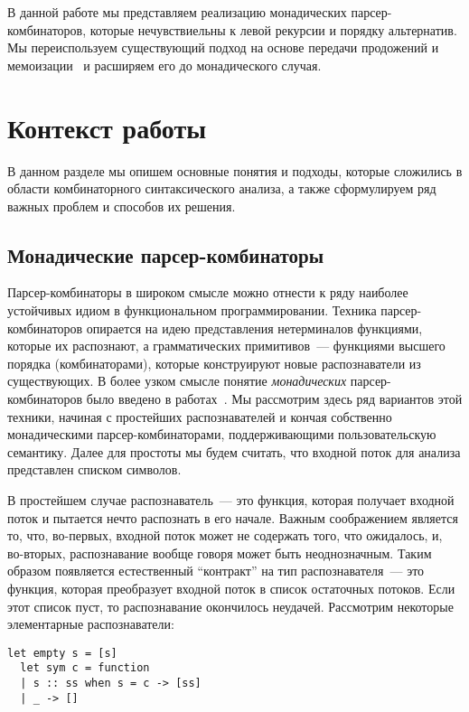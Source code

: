 \documentclass[conference]{IEEEtran}
\begin{document}
В данной работе мы представляем реализацию монадических парсер-комбинаторов, которые нечувствиельны к левой рекурсии и порядку альтернатив. Мы переиспользуем
существующий подход на основе передачи продожений и мемоизации~\cite{meerkat} и расширяем его до монадического случая.

\section{Контекст работы}

В данном разделе мы опишем основные понятия и подходы, которые сложились в области комбинаторного синтаксического анализа, а также сформулируем ряд важных проблем и
способов их решения.

\subsection{Монадические парсер-комбинаторы}

Парсер-комбинаторы в широком смысле можно отнести к ряду наиболее устойчивых идиом в функциональном программировании. Техника парсер-комбинаторов опирается на идею
представления нетерминалов функциями, которые их распознают, а грамматических примитивов~--- функциями высшего порядка (комбинаторами), которые конструируют новые
распознаватели из существующих. В более узком смысле понятие \emph{монадических} парсер-комбинаторов было введено в работах~\cite{meijer,wadler}. Мы рассмотрим здесь ряд вариантов
этой техники, начиная с простейших распознавателей и кончая собственно монадическими парсер-комбинаторами, поддерживающими пользовательскую семантику. Далее для простоты
мы будем считать, что входной поток для анализа представлен списком символов.

В простейшем случае распознаватель~--- это функция, которая получает входной поток и пытается нечто распознать в его начале. Важным соображением является то, что, во-первых,
входной поток может не содержать того, что ожидалось, и, во-вторых, распознавание вообще говоря может быть неоднозначным. Таким образом появляется естественный ``контракт''
на тип распознавателя~--- это функция, которая преобразует входной поток в список остаточных потоков. Если этот список пуст, то распознавание окончилось неудачей.
Рассмотрим некоторые элементарные распознаватели:

\begin{lstlisting}[basicstyle=\small]
  let empty s = [s]
  let sym c = function
  | s :: ss when s = c -> [ss]
  | _ -> []
\end{lstlisting}
\end{document}
